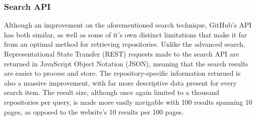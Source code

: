 \subsubsection{Search API}

Although an improvement on the aforementioned search technique, GitHub's API has both similar, as well as some of it's own distinct limitations that make it far from an optimal method for retrieving repositories.
Unlike the advanced search, Representational State Transfer (REST) requests made to the search API are returned in JavaScript Object Notation (JSON), meaning that the search results are easier to process and store.
The repository-specific information returned is also a massive improvement, with far more descriptive data present for every search item.
The result size, although once again limited to a thousand repositories per query, is made more easily navigable with 100 results spanning 10 pages, as opposed to the website's 10 results per 100 pages.